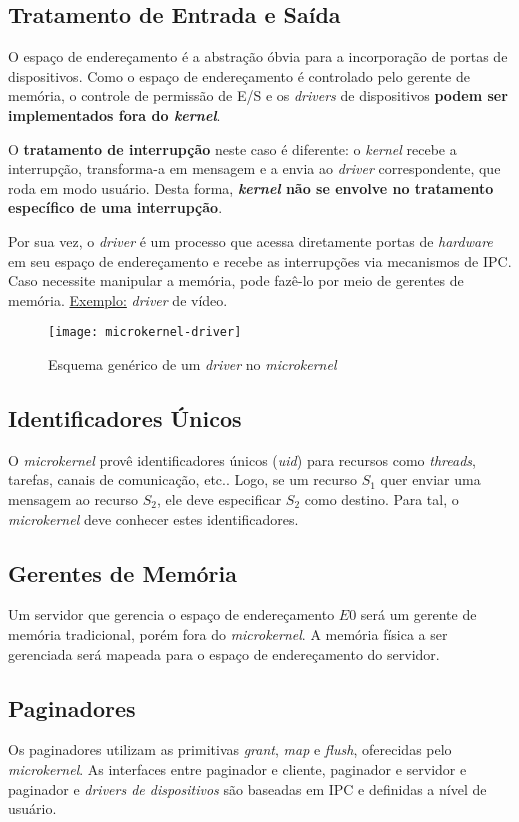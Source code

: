 \subsection{Tratamento de Entrada e Saída}
O espaço de endereçamento é a abstração óbvia para a incorporação de portas de dispositivos. Como o espaço de endereçamento é controlado pelo gerente de memória, o controle de permissão de E/S e os \textit{drivers} de dispositivos \textbf{podem ser implementados fora do \textit{kernel}}.

O \textbf{tratamento de interrupção} neste caso é diferente: o \textit{kernel} recebe a interrupção, transforma-a em mensagem e a envia ao \textit{driver} correspondente, que roda em modo usuário. Desta forma, \textbf{\textit{kernel} não se envolve no tratamento específico de uma interrupção}.

Por sua vez, o \textit{driver} é um processo que acessa diretamente portas de \textit{hardware} em seu espaço de endereçamento e recebe as interrupções via mecanismos de IPC. Caso necessite manipular a memória, pode fazê-lo por meio de gerentes de memória. \underline{Exemplo:} \textit{driver} de vídeo.

\begin{figure}[H]
  \centering
  \texttt{[image: microkernel-driver]}
  \caption{Esquema genérico de um \textit{driver} no \textit{microkernel}}
  \label{fig:microkernel-driver}
\end{figure}

\subsection{Identificadores Únicos}
O \textit{microkernel} provê identificadores únicos (\textit{uid}) para recursos como \textit{threads}, tarefas, canais de comunicação, etc.. Logo, se um recurso $S_1$ quer enviar uma mensagem ao recurso $S_2$, ele deve especificar $S_2$ como destino. Para tal, o \textit{microkernel} deve conhecer estes identificadores.

\subsection{Gerentes de Memória}
Um servidor que gerencia o espaço de endereçamento $E0$ será um gerente de memória tradicional, porém fora do \textit{microkernel}. A memória física a ser gerenciada será mapeada para o espaço de endereçamento do servidor.

\subsection{Paginadores}
Os paginadores utilizam as primitivas \textit{grant}, \textit{map} e \textit{flush}, oferecidas pelo \textit{microkernel}. As interfaces entre paginador e cliente, paginador e servidor e paginador e \textit{drivers de dispositivos} são baseadas em IPC e definidas a nível de usuário.









